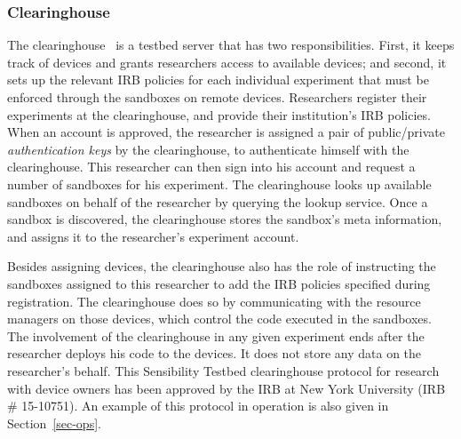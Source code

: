 \subsubsection{Clearinghouse}\label{sec-ch}
The clearinghouse~\cite{ch} is a testbed server that has two 
responsibilities. First, it keeps track of devices and grants 
researchers access to available devices; and second, it
sets up the relevant IRB policies for each individual experiment that 
must be enforced through the sandboxes on remote devices.
Researchers register their experiments at the clearinghouse, and 
provide their institution's IRB 
policies. When an account is approved, the researcher is assigned 
a pair of public/private \textit{authentication keys} by the 
clearinghouse, to authenticate himself with the clearinghouse. This
researcher can then sign into his account and request a 
number of sandboxes for his experiment. The clearinghouse 
looks up available sandboxes on behalf of the researcher by 
querying the lookup service. Once a sandbox is discovered, the 
clearinghouse stores the sandbox's meta information, 
and assigns it to the researcher's experiment account. 

Besides assigning devices, the clearinghouse also has the role of 
instructing the sandboxes assigned to this researcher to add the IRB 
policies specified during registration. The clearinghouse does so 
by communicating with the resource managers on those devices, which 
control the code executed in the sandboxes. The involvement of the 
clearinghouse in any given experiment ends 
after the researcher deploys his code to the devices. It does not store any
data on the researcher's behalf. 
This Sensibility Testbed clearinghouse 
protocol for research with device owners has been approved by
the IRB at New York University (IRB \# 15-10751). An example 
of this protocol in operation is also given in Section~\ref{sec-ops}.


